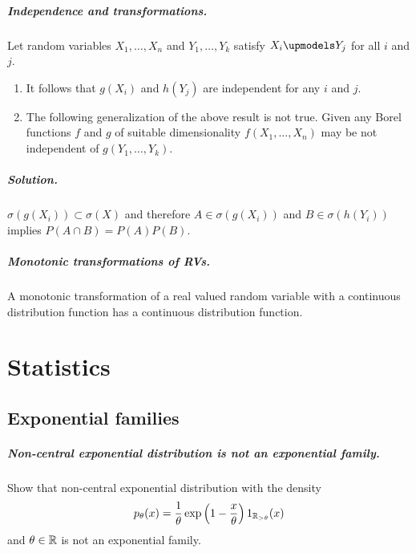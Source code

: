 \documentclass[11pt,oldfontcommands,oneside,onecolumn]{memoir}
\begin{document}
\paragraph{Independence and transformations. } Let random variables $X_1,\ldots,X_n$ and
$Y_1,\ldots,Y_k$ satisfy $X_i \upmodels Y_j$ for all $i$ and $j$.
\begin{enumerate}
    \item It follows that $g(X_i)$ and $h(Y_j)$ are independent for any $i$ and $j$.
    \item The following generalization of the above result is not true. Given
any Borel functions $f$ and $g$ of suitable dimensionality 
$f(X_1,\ldots,X_n)$ may be not independent of $g(Y_1,\ldots,Y_k)$.
\end{enumerate}

\paragraph{Solution. } $\sigma\left( g(X_i) \right) \subset \sigma(X)$ and therefore 
$A\in\sigma(g(X_i))$ and $B\in\sigma(h(Y_i))$ implies $P(A\cap B)=P(A)P(B)$.



\paragraph{Monotonic transformations of RVs. }   A monotonic transformation of a real
valued random variable with a continuous distribution function has a continuous
distribution function. 


















\chapter{Statistics}


\section{Exponential families}

\paragraph{Non-central exponential distribution is not an exponential family. } %
Show that non-central exponential distribution with the density
\begin{equation}
    p_\theta(x) = \frac{1}{\theta} \exp\left( 1- \frac{x}{\theta} \right)1_{\mathbb R_{>\theta}}(x)
\end{equation}
and $\theta\in\mathbb R$ is not an exponential family. 
\end{document}
